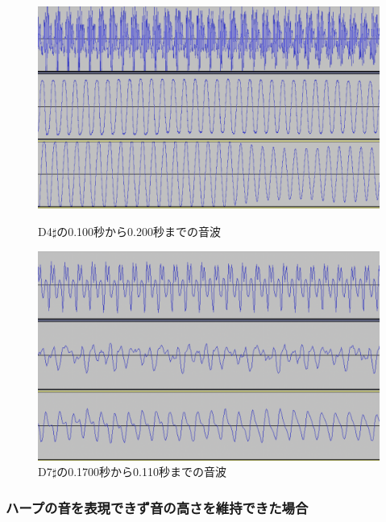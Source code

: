 \begin{figure}[b]
\begin{center}
\begin{minipage}{0.48\hsize}
\begin{center}
\includegraphics[width=0.85\hsize]{figure/66_22_det/d4s_0100_0200.png}
\caption{D4$\sharp$の0.100秒から0.200秒までの音波}
\label{fig:66_22_near}
\end{center}
\end{minipage}
\begin{minipage}{0.48\hsize}
\begin{center}
\includegraphics[width=0.85\hsize]{figure/66_22_det/d7s_0100_0110.png}
\caption{D7$\sharp$の0.1700秒から0.110秒までの音波}
\label{fig:66_22_bad4}
\end{center}
\end{minipage}
\end{center}
\end{figure}

\subsubsection{ハープの音を表現できず音の高さを維持できた場合}

